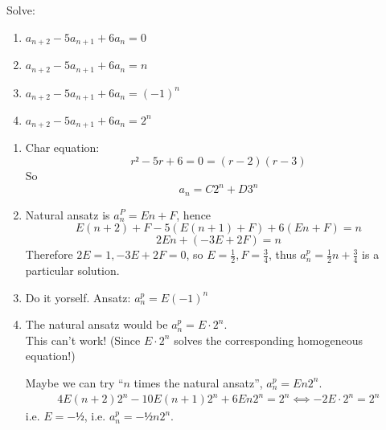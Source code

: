 \documentclass[english]{lbscript}
\begin{document}
\begin{example}{}{}
	Solve:
	\begin{enumerate}[label=\alph{*})]
		\item\label{item:25} \(a_{n+2}-5 a_{n+1} + 6 a_n = 0\)
		\item\label{item:26} \(a_{n+2}-5 a_{n+1} + 6 a_n = n\)
		\item\label{item:28} \(a_{n+2}-5 a_{n+1} + 6 a_n = (-1)^{n}\)
		\item\label{item:29} \(a_{n+2}-5 a_{n+1} + 6 a_n = 2^{n}\)
	\end{enumerate}
	\tcblower
	\begin{enumerate}[label=Sol. \alph{*})]
		\item Char equation:
		      \begin{equation}
			      \label{eq:83}
			      r² - 5r + 6 = 0 = (r-2)(r-3)
		      \end{equation}
		      So
		      \begin{equation}
			      \label{eq:84}
			      a_n=C 2^{n} + D 3^{n}
		      \end{equation}
		\item Natural ansatz is \(a_{n}^{P}= En +F\), hence
		      \begin{equation}
			      \label{eq:85}
			      E(n+2)+F - 5 (E(n+1)+F)+6(En+F)  = n
		      \end{equation}
		      \begin{equation}
			      \label{eq:86}
			      2En + (-3E +2F) = n
		      \end{equation}
		      Therefore \(2E=1, -3E+2F=0\), so \(E= \frac{1}{2}, F= \frac{3}{4}\), thus \(a_{n}^{p}= \frac{1}{2}n + \frac{3}{4}\) is a particular solution.
		      \item\label{item:30} Do it yorself. Ansatz: \(a^{p}_{n}= E (-1)^{n}\)
		      \item\label{item:31} The natural ansatz would be \(a_n^{p}=E⋅2^{n}\).\\
		      This can't work! (Since \(E⋅2^{n}\) solves the corresponding homogeneous equation!)

		      Maybe we can try \enquote{\(n\) times the natural ansatz}, \(a_n^{p}=En2^{n}\).
		      \begin{align}
			      \label{eq:87}
			      4E(n+2)2^{n} - 10E(n+1)2^{n} + 6 E n 2^{n} = 2^{n} ⟺ -2E⋅2^{n} = 2^{n}
		      \end{align}
		      i.e. \(E=-½\), i.e. \(a_n^{p}=-½n 2^{n}\).
	\end{enumerate}
\end{example}
\end{document}
